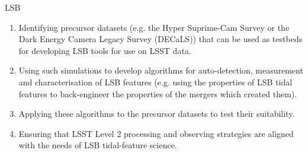 {\begin{tasklist}{LSB}
\begin{task}
{\begin{enumerate}
\item Identifying precursor datasets (e.g. the Hyper Suprime-Cam Survey or the Dark Energy Camera Legacy Survey (DECaLS)) that can be used as testbeds for developing LSB tools for use on LSST data.
\item Using  such  simulations   to  develop algorithms for auto-detection, measurement and characterisation of LSB features (e.g. using the properties of LSB tidal features to back-engineer the properties of the mergers which created them).
\item Applying these algorithms to the precursor datasets to test their suitability.
\item Ensuring  that LSST Level 2 processing  and observing  strategies are  aligned with the needs of LSB tidal-feature science.
\end{enumerate}
}
~\\
\end{task}



\end{tasklist}}
